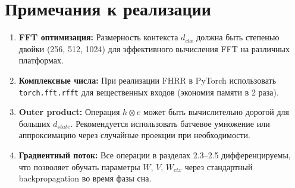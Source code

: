 \section{Примечания к реализации}

\begin{enumerate}
    \item \textbf{FFT оптимизация:} Размерность контекста $d_{ctx}$ должна быть степенью двойки (256, 512, 1024) для эффективного вычисления FFT на различных платформах.
    
    \item \textbf{Комплексные числа:} При реализации FHRR в PyTorch использовать \texttt{torch.fft.rfft} для вещественных входов (экономия памяти в 2 раза).
    
    \item \textbf{Outer product:} Операция $h \otimes e$ может быть вычислительно дорогой для больших $d_{state}$. Рекомендуется использовать батчевое умножение или аппроксимацию через случайные проекции при необходимости.
    
    \item \textbf{Градиентный поток:} Все операции в разделах 2.3–2.5 дифференцируемы, что позволяет обучать параметры $W$, $V$, $W_{ctx}$ через стандартный backpropagation во время фазы сна.
\end{enumerate}
